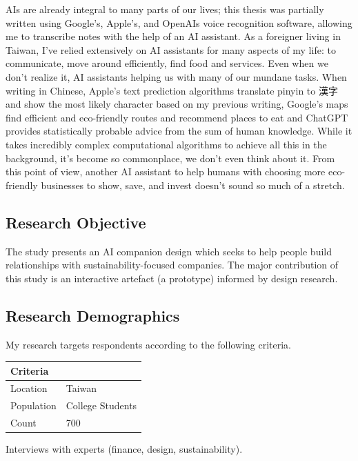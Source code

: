 \documentclass[
  letterpaper,
  DIV=11,
  numbers=noendperiod]{scrartcl}
\begin{document}
AIs are already integral to many parts of our lives; this thesis was
partially written using Google's, Apple's, and OpenAIs voice recognition
software, allowing me to transcribe notes with the help of an AI
assistant. As a foreigner living in Taiwan, I've relied extensively on
AI assistants for many aspects of my life: to communicate, move around
efficiently, find food and services. Even when we don't realize it, AI
assistants helping us with many of our mundane tasks. When writing in
Chinese, Apple's text prediction algorithms translate pinyin to 漢字 and
show the most likely character based on my previous writing, Google's
maps find efficient and eco-friendly routes and recommend places to eat
and ChatGPT provides statistically probable advice from the sum of human
knowledge. While it takes incredibly complex computational algorithms to
achieve all this in the background, it's become so commonplace, we don't
even think about it. From this point of view, another AI assistant to
help humans with choosing more eco-friendly businesses to show, save,
and invest doesn't sound so much of a stretch.

\subsection{Research Objective}\label{research-objective}

The study presents an AI companion design which seeks to help people
build relationships with sustainability-focused companies. The major
contribution of this study is an interactive artefact (a prototype)
informed by design research.

\subsection{Research Demographics}\label{research-demographics}

My research targets respondents according to the following criteria.

\begin{longtable}[]{@{}ll@{}}
\toprule\noalign{}
Criteria & \\
\midrule\noalign{}
\endhead
\bottomrule\noalign{}
\endlastfoot
Location & Taiwan \\
Population & College Students \\
Count & 700 \\
\end{longtable}

Interviews with experts (finance, design, sustainability).
\end{document}
